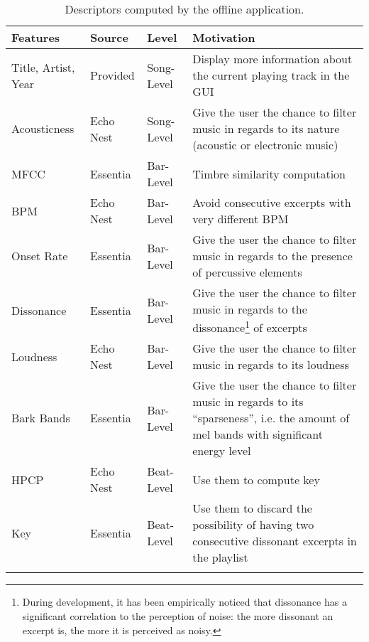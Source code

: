 \begin{center} 
\begin{longtable}{ p{}  p{}  p{}  p{} } 
\textbf{Features} & \textbf{Source} & \textbf{Level} & \textbf{Motivation} \\ \toprule
Title, Artist, Year & Provided & Song-Level & Display more information about the current playing track in the GUI \\ \midrule
Acousticness & Echo Nest & Song-Level & Give the user the chance to filter music in regards to its nature (acoustic or electronic music) \\ \midrule
MFCC & Essentia & Bar-Level & Timbre similarity computation \\ \midrule
BPM & Echo Nest & Bar-Level & Avoid consecutive excerpts with very different BPM \\ \midrule
Onset Rate & Essentia & Bar-Level & Give the user the chance to filter music in regards to the presence of percussive elements \\ \midrule
Dissonance & Essentia & Bar-Level & Give the user the chance to filter music in regards to the dissonance\footnote{During development, it has been empirically noticed that dissonance has a significant correlation to the perception of noise: the more dissonant an excerpt is, the more it is perceived as noisy.} of excerpts \\ \midrule
Loudness & Echo Nest & Bar-Level & Give the user the chance to filter music in regards to its loudness \\ \midrule
Bark Bands & Essentia & Bar-Level & Give the user the chance to filter music in regards to its ``sparseness'', i.e. the amount of mel bands with significant energy level \\ \midrule
HPCP & Echo Nest & Beat-Level & Use them to compute key \\ \midrule
Key & Essentia & Beat-Level & Use them to discard the possibility of having two consecutive dissonant excerpts in the playlist \\ \bottomrule
\caption[List of descriptors computed offline]{Descriptors computed by the offline application.}
\label{table:offlinedescriptors}
\end{longtable}
\end{center}


